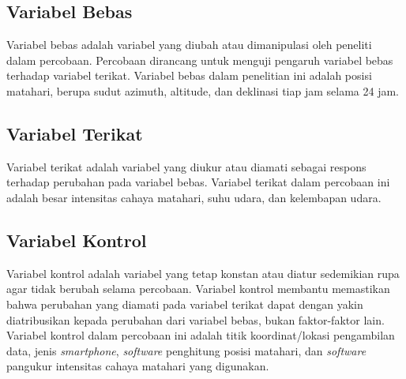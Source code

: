 \subsection{Variabel Bebas}
Variabel bebas adalah variabel yang diubah atau dimanipulasi oleh peneliti dalam percobaan. Percobaan dirancang untuk menguji pengaruh variabel bebas terhadap variabel terikat. Variabel bebas dalam penelitian ini adalah posisi matahari, berupa sudut azimuth, altitude, dan deklinasi tiap jam selama 24 jam.
\subsection{Variabel Terikat}
Variabel terikat adalah variabel yang diukur atau diamati sebagai respons terhadap perubahan pada variabel bebas. Variabel terikat dalam percobaan ini adalah besar intensitas cahaya matahari, suhu udara, dan kelembapan udara.
\subsection{Variabel Kontrol}
Variabel kontrol adalah variabel yang tetap konstan atau diatur sedemikian rupa agar tidak berubah selama percobaan. Variabel kontrol membantu memastikan bahwa perubahan yang diamati pada variabel terikat dapat dengan yakin diatribusikan kepada perubahan dari variabel bebas, bukan faktor-faktor lain. Variabel kontrol dalam percobaan ini adalah titik koordinat/lokasi pengambilan data, jenis \textit{smartphone}, \textit{software} penghitung posisi matahari, dan \textit{software} pangukur intensitas cahaya matahari yang digunakan.